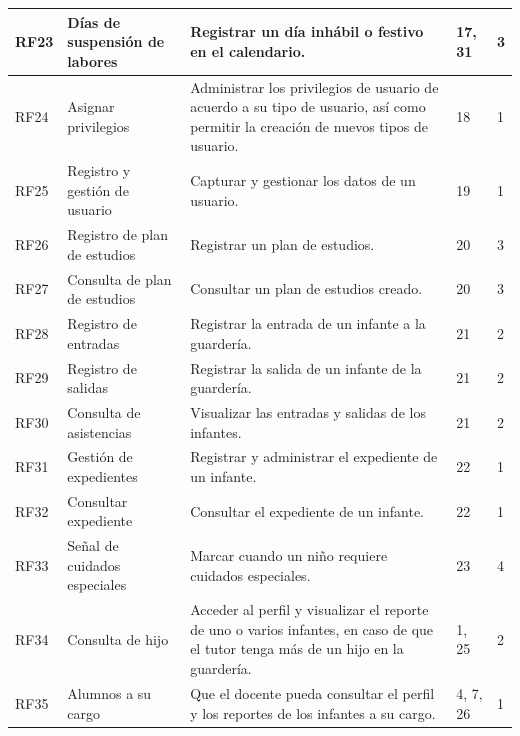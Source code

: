 \documentclass{article}
\begin{document}
\begin{longtable}{|p{1.0cm}|p{3.0cm}|p{5.0cm}|p{1.2cm}|p{0.75cm}|}
	RF23 &
	Días de suspensión de labores &
	Registrar un día inhábil o festivo en el calendario. &
	17, 31 & 
	 3
	\\ \hline

	RF24 &
	Asignar privilegios &
	Administrar los privilegios de usuario de acuerdo a su  tipo de usuario, así como permitir la creación de nuevos tipos de usuario. &
	18 & 
	 1
	\\ \hline

	RF25 &
	Registro y gestión de usuario &
	Capturar y gestionar los datos de un usuario. &
	19 & 
	 1
	\\ \hline

	RF26 &
	Registro de plan de estudios &
	Registrar un plan de estudios. &
	20 & 
	 3
	\\ \hline

	RF27 &
	Consulta de plan de estudios &
	Consultar un plan de estudios creado. &
	20 & 
	 3
	\\ \hline

	RF28 &
	Registro de entradas &
	Registrar la entrada de un infante a la guardería. &
	21 & 
	 2
	\\ \hline

	RF29 &
	Registro de salidas &
	Registrar la salida de un infante de la guardería. &
	21 & 
	 2
	\\ \hline

	RF30 &
	Consulta de asistencias &
	Visualizar las entradas y salidas de los infantes. &
	21 & 
	 2
	\\ \hline

	RF31 &
	Gestión de expedientes &
	Registrar y administrar el expediente de un infante. &
	22 & 
	 1
	\\ \hline

	RF32 &
	Consultar expediente &
	Consultar el expediente de un infante. &
	22 & 
	 1
	\\ \hline

	RF33 &
	Señal de cuidados especiales &
	Marcar cuando un niño requiere cuidados especiales. &
	23 & 
	 4
	\\ \hline

	RF34 &
	Consulta de hijo &
	Acceder al perfil y visualizar el reporte de uno o varios infantes, en caso de que el tutor tenga más de un hijo en la guardería. &
	1, 25 & 
	 2
	\\ \hline

	RF35 &
	Alumnos a su cargo &
	Que el docente pueda consultar el perfil y los reportes de los infantes a su cargo. &
	4, 7, 26 & 
	 1
	\\ \hline


\end{longtable}
\end{document}
